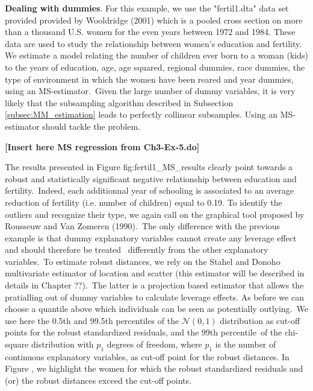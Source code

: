 \begin{stexample}
\textbf{Dealing with dummies}. For this example, we use the "fertil1.dta" data
set provided provided by Wooldridge (2001) which is a pooled cross section on
more than a thousand U.S. women for the even years between 1972 and 1984.
These data are used to study the relationship between women's education and
fertility. We estimate a model relating the number of children ever born to a
woman (kids) to the years of education, age, age squared, regional dummies,
race dummies, the type of environment in which the women have been reared and
year dummies, using an MS-estimator.\ Given the large number of dummy
variables, it is very likely that the subsampling algorithm described in
Subsection \ref{subsec:MM_estimation} leads to perfectly collinear subsamples.
Using an MS-estimator should tackle the problem.\newline

\textbf{[Insert here MS regression from Ch3-Ex-5.do]}\newline

The results presented in Figure fig:fertil1\_MS\_results clearly point towards
a robust and statistically significant negative relationship between education
and fertility.\ Indeed, each additionnal year of schooling is associated to an
average reduction of fertility (i.e. number of children) equal to 0.19. To
identify the outliers and recognize their type, we again call on the graphical
tool proposed by Rousseuw and Van Zomeren (1990).\ The only difference with
the previous example is that dummy explanatory variables cannot create any
leverage effect and should therefore be treated \ differently from the other
explanatory variables.\ To estimate robust distances, we rely on the Stahel
and Donoho multivariate estimator of location and scatter (this estimator will
be described in details in Chapter ??).\ The latter is a projection based
estimator that allows the pratialling out of dummy variables to calculate
leverage effects. As before we can choose a quantile above which individuals
can be seen as potentially outlying.\ We use here the 0.5th and 99.5th
percentiles of the $\mathcal{N}(0,1)$ distribution as cut-off points for the
robust standardized residuals, and the 99th percentile\ of the chi-square
distribution with $p_{1}$ degrees of freedom, where $p_{1}$ is the number of
continuous explanatory variables, as cut-off point for the robust distances.
In Figure %
, we highlight the women for which
the robust standardized residuals and (or) the robust distances exceed the
cut-off points.


\end{stexample}
